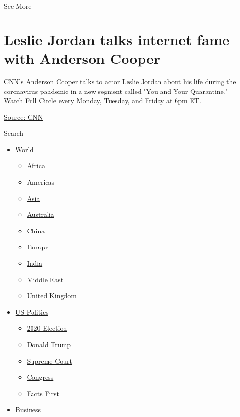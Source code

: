 See More

\hypertarget{leslie-jordan-talks-internet-fame-with-anderson-cooper-2}{%
\section{Leslie Jordan talks internet fame with Anderson
Cooper}\label{leslie-jordan-talks-internet-fame-with-anderson-cooper-2}}

CNN's Anderson Cooper talks to actor Leslie Jordan about his life during
the coronavirus pandemic in a new segment called "You and Your
Quarantine." Watch Full Circle every Monday, Tuesday, and Friday at 6pm
ET.

\href{https://www.cnn.com/}{Source: CNN}

Search

\begin{itemize}
\tightlist
\item
  \href{/world}{World}

  \begin{itemize}
  \tightlist
  \item
    \href{/africa}{Africa}
  \item
    \href{/americas}{Americas}
  \item
    \href{/asia}{Asia}
  \item
    \href{/australia}{Australia}
  \item
    \href{/china}{China}
  \item
    \href{/europe}{Europe}
  \item
    \href{/india}{India}
  \item
    \href{/middle-east}{Middle East}
  \item
    \href{/uk}{United Kingdom}
  \end{itemize}
\item
  \href{/politics}{US Politics}

  \begin{itemize}
  \tightlist
  \item
    \href{/election/2020}{2020 Election}
  \item
    \href{/specials/politics/president-donald-trump-45}{Donald Trump}
  \item
    \href{/specials/politics/supreme-court-nine}{Supreme Court}
  \item
    \href{/specials/politics/congress}{Congress}
  \item
    \href{/specials/politics/fact-check-politics}{Facts First}
  \end{itemize}
\item
  \href{/business}{Business}


\end{itemize}
